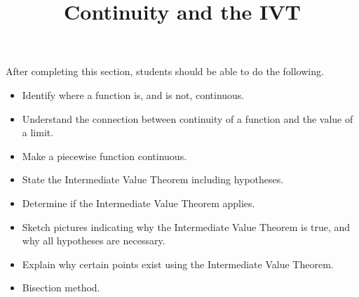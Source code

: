 \documentclass{ximera}
\title{Continuity and the IVT}
\begin{document}
\begin{abstract}
\end{abstract}

\maketitle

\begin{sectionOutcomes}
After completing this section, students should be able to do the following.

\begin{itemize}
\item Identify where a function is, and is not, continuous.
\item Understand the connection between continuity of a function and
  the value of a limit.
\item Make a piecewise function continuous.
\item State the Intermediate Value Theorem including hypotheses.
\item Determine if the Intermediate Value Theorem applies.
\item Sketch pictures indicating why the Intermediate Value Theorem is
  true, and why all hypotheses are necessary.
\item Explain why certain points exist using the Intermediate Value
  Theorem.
\item Bisection method.
\end{itemize}

\end{sectionOutcomes}
\end{document}
